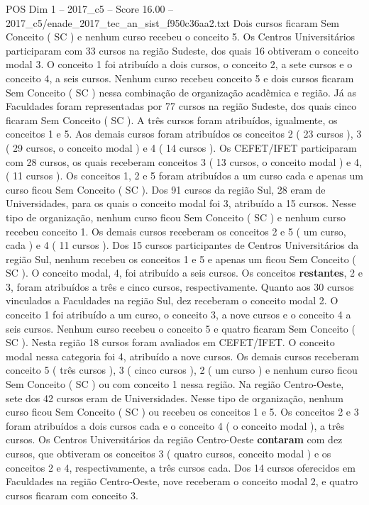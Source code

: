 \begin{textsample}{POS Dim 1 – 2017\_c5 – Score 16.00 – 2017\_c5/enade\_2017\_tec\_an\_sist\_f950c36aa2.txt}
Dois cursos ficaram Sem Conceito ( SC ) e nenhum curso recebeu o conceito 5.
Os Centros Universitários participaram com 33 cursos na região Sudeste, dos quais 16 obtiveram o conceito modal 3.
O conceito 1 foi atribuído a dois cursos, o conceito 2, a sete cursos e o conceito 4, a seis cursos.
Nenhum curso recebeu conceito 5 e dois cursos ficaram Sem Conceito ( SC ) nessa combinação de organização acadêmica e região.
Já as Faculdades foram representadas por 77 cursos na região Sudeste, dos quais cinco ficaram Sem Conceito ( SC ).
A três cursos foram atribuídos, igualmente, os conceitos 1 e 5.
Aos demais cursos foram atribuídos os conceitos 2 ( 23 cursos ), 3 ( 29 cursos, o conceito modal ) e 4 ( 14 cursos ).
Os CEFET/IFET participaram com 28 cursos, os quais receberam conceitos 3 ( 13 cursos, o conceito modal ) e 4, ( 11 cursos ).
Os conceitos 1, 2 e 5 foram atribuídos a um curso cada e apenas um curso ficou Sem Conceito ( SC ).
Dos 91 cursos da região Sul, 28 eram de Universidades, para os quais o conceito modal foi 3, atribuído a 15 cursos.
Nesse tipo de organização, nenhum curso ficou Sem Conceito ( SC ) e nenhum curso recebeu conceito 1.
Os demais cursos receberam os conceitos 2 e 5 ( um curso, cada ) e 4 ( 11 cursos ).
Dos 15 cursos participantes de Centros Universitários da região Sul, nenhum recebeu os conceitos 1 e 5 e apenas um ficou Sem Conceito ( SC ).
O conceito modal, 4, foi atribuído a seis cursos.
Os conceitos \textbf{restantes}, 2 e 3, foram atribuídos a três e cinco cursos, respectivamente.
Quanto aos 30 cursos vinculados a Faculdades na região Sul, dez receberam o conceito modal 2.
O conceito 1 foi atribuído a um curso, o conceito 3, a nove cursos e o conceito 4 a seis cursos.
Nenhum curso recebeu o conceito 5 e quatro ficaram Sem Conceito ( SC ).
Nesta região 18 cursos foram avaliados em CEFET/IFET.
O conceito modal nessa categoria foi 4, atribuído a nove cursos.
Os demais cursos receberam conceito 5 ( três cursos ), 3 ( cinco cursos ), 2 ( um curso ) e nenhum curso ficou Sem Conceito ( SC ) ou com conceito 1 nessa região.
Na região Centro-Oeste, sete dos 42 cursos eram de Universidades.
Nesse tipo de organização, nenhum curso ficou Sem Conceito ( SC ) ou recebeu os conceitos 1 e 5.
Os conceitos 2 e 3 foram atribuídos a dois cursos cada e o conceito 4 ( o conceito modal ), a três cursos.
Os Centros Universitários da região Centro-Oeste \textbf{contaram} com dez cursos, que obtiveram os conceitos 3 ( quatro cursos, conceito modal ) e os conceitos 2 e 4, respectivamente, a três cursos cada.
Dos 14 cursos oferecidos em Faculdades na região Centro-Oeste, nove receberam o conceito modal 2, e quatro cursos ficaram com conceito 3.

\end{textsample}
